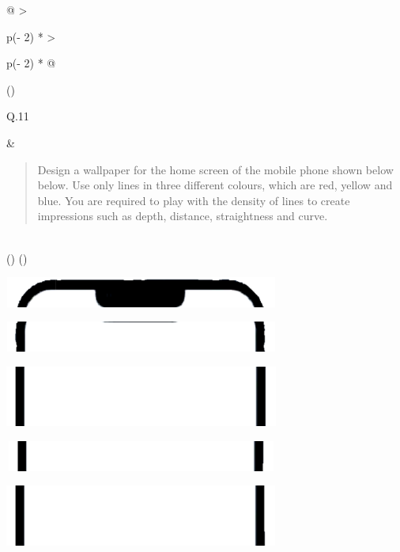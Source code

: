 \documentclass[
]{article}
\begin{document}
\begin{longtable}[]{@{}
  >{\raggedright\arraybackslash}p{(\columnwidth - 2\tabcolsep) * }
  >{\raggedright\arraybackslash}p{(\columnwidth - 2\tabcolsep) * }@{}}
\toprule()
\begin{minipage}[b]{\linewidth}\raggedright
Q.11
\end{minipage} & \begin{minipage}[b]{\linewidth}\raggedright
\begin{quote}
Design a wallpaper for the home screen of the mobile phone shown below
below. Use only lines in three different colours, which are red, yellow
and blue. You are required to play with the density of lines to create
impressions such as depth, distance, straightness and curve.
\end{quote}
\end{minipage} \\
\midrule()
\endhead
\bottomrule()
\end{longtable}

\includegraphics[width=3.54722in,height=0.39306in]{vertopal_2361032064654423b71b7db67d98c753/media/image18.png}

\includegraphics[width=3.54722in,height=0.39306in]{vertopal_2361032064654423b71b7db67d98c753/media/image19.png}

\includegraphics[width=3.54722in,height=0.7875in]{vertopal_2361032064654423b71b7db67d98c753/media/image20.png}

\includegraphics[width=3.54722in,height=0.39306in]{vertopal_2361032064654423b71b7db67d98c753/media/image21.png}

\includegraphics[width=3.54722in,height=0.78611in]{vertopal_2361032064654423b71b7db67d98c753/media/image22.png}
\end{document}

